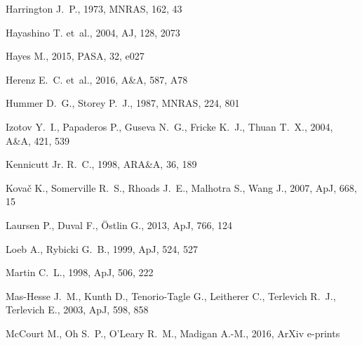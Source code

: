 \documentclass[a4,useAMS,usenatbib,usegraphicx]{mn2e}
\newcommand{\apj}{ApJ}
\newcommand{\pasa}{PASA}
\newcommand{\aj}{AJ}
\newcommand{\mnras}{MNRAS}
\newcommand{\aap}{A\&A}
\newcommand{\araa}{ARA\&A}
\begin{document}
\begin{thebibliography}{}
{Harrington} J.~P.,  1973, \mnras, 162, 43

{Hayashino} T.  et~al., 2004, \aj, 128, 2073

{Hayes} M.,  2015, \pasa, 32, e027

{Herenz} E.~C.  et~al., 2016, \aap, 587, A78

{Hummer} D.~G.,  {Storey} P.~J.,  1987, \mnras, 224, 801

{Izotov} Y.~I.,  {Papaderos} P.,  {Guseva} N.~G.,  {Fricke} K.~J.,    {Thuan}
  T.~X.,  2004, \aap, 421, 539

{Kennicutt} Jr. R.~C.,  1998, \araa, 36, 189

{Kova{\v c}} K.,  {Somerville} R.~S.,  {Rhoads} J.~E.,  {Malhotra} S.,
  {Wang} J.,  2007, \apj, 668, 15

{Laursen} P.,  {Duval} F.,    {{\"O}stlin} G.,  2013, \apj, 766, 124

{Loeb} A.,  {Rybicki} G.~B.,  1999, \apj, 524, 527

{Martin} C.~L.,  1998, \apj, 506, 222

{Mas-Hesse} J.~M.,  {Kunth} D.,  {Tenorio-Tagle} G.,  {Leitherer} C.,
  {Terlevich} R.~J.,    {Terlevich} E.,  2003, \apj, 598, 858

{McCourt} M.,  {Oh} S.~P.,  {O'Leary} R.~M.,    {Madigan} A.-M.,  2016, ArXiv
  e-prints


\end{thebibliography}
\end{document}
